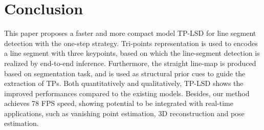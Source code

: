 \documentclass[runningheads]{llncs}
\begin{document}
\section{Conclusion}
This paper proposes a faster and more compact model TP-LSD for line segment detection with the one-step strategy. Tri-points representation is used to encodes a line segment with three keypoints, based on which the line-segment detection is realized by end-to-end inference.
Furthermore, the straight line-map is produced based on segmentation task, and is used as structural prior cues to guide the extraction of TPs.
Both quantitatively and qualitatively, TP-LSD shows the improved performances compared to the existing models. Besides, 
our method achieves 78 FPS speed, showing potential to be integrated with real-time applications, such as vanishing point estimation, 3D reconstruction and pose estimation.
\end{document}

